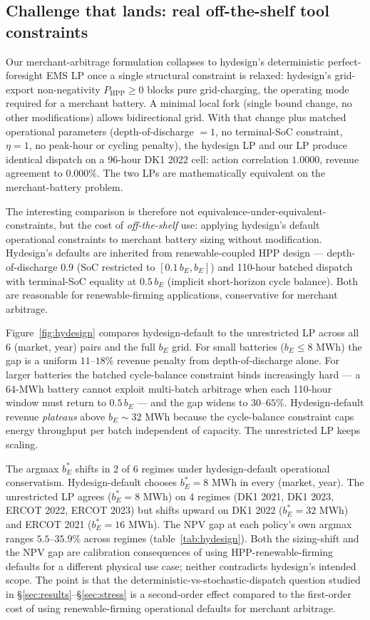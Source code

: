 \documentclass[11pt]{article}
\begin{document}
\subsection{Challenge that lands: real off-the-shelf tool constraints}\label{sec:hydesign}

Our merchant-arbitrage formulation collapses to hydesign's deterministic perfect-foresight EMS LP \citep{murcia2024hydesign} once a single structural constraint is relaxed: hydesign's grid-export non-negativity $P_{\mathrm{HPP}} \ge 0$ blocks pure grid-charging, the operating mode required for a merchant battery. A minimal local fork (single bound change, no other modifications) allows bidirectional grid. With that change plus matched operational parameters (depth-of-discharge $= 1$, no terminal-SoC constraint, $\eta = 1$, no peak-hour or cycling penalty), the hydesign LP and our LP produce identical dispatch on a 96-hour DK1 2022 cell: action correlation $1.0000$, revenue agreement to $0.000\%$. The two LPs are mathematically equivalent on the merchant-battery problem.

The interesting comparison is therefore not equivalence-under-equivalent-constraints, but the cost of \emph{off-the-shelf} use: applying hydesign's default operational constraints to merchant battery sizing without modification. Hydesign's defaults are inherited from renewable-coupled HPP design --- depth-of-discharge $0.9$ (SoC restricted to $[0.1\,b_E, b_E]$) and 110-hour batched dispatch with terminal-SoC equality at $0.5\,b_E$ (implicit short-horizon cycle balance). Both are reasonable for renewable-firming applications, conservative for merchant arbitrage.

Figure~\ref{fig:hydesign} compares hydesign-default to the unrestricted LP across all 6 (market, year) pairs and the full $b_E$ grid. For small batteries ($b_E \le 8$ MWh) the gap is a uniform $11$--$18\%$ revenue penalty from depth-of-discharge alone. For larger batteries the batched cycle-balance constraint binds increasingly hard --- a 64-MWh battery cannot exploit multi-batch arbitrage when each 110-hour window must return to $0.5\,b_E$ --- and the gap widens to $30$--$65\%$. Hydesign-default revenue \emph{plateaus} above $b_E \sim 32$ MWh because the cycle-balance constraint caps energy throughput per batch independent of capacity. The unrestricted LP keeps scaling.

The argmax $b_E^*$ shifts in 2 of 6 regimes under hydesign-default operational conservatism. Hydesign-default chooses $b_E^* = 8$ MWh in every (market, year). The unrestricted LP agrees ($b_E^* = 8$ MWh) on $4$ regimes (DK1 2021, DK1 2023, ERCOT 2022, ERCOT 2023) but shifts upward on DK1 2022 ($b_E^* = 32$ MWh) and ERCOT 2021 ($b_E^* = 16$ MWh). The NPV gap at each policy's own argmax ranges $5.5$--$35.9\%$ across regimes (table~\ref{tab:hydesign}). Both the sizing-shift and the NPV gap are calibration consequences of using HPP-renewable-firming defaults for a different physical use case; neither contradicts hydesign's intended scope. The point is that the deterministic-vs-stochastic-dispatch question studied in \S\ref{sec:results}--\S\ref{sec:stress} is a second-order effect compared to the first-order cost of using renewable-firming operational defaults for merchant arbitrage.
\end{document}
